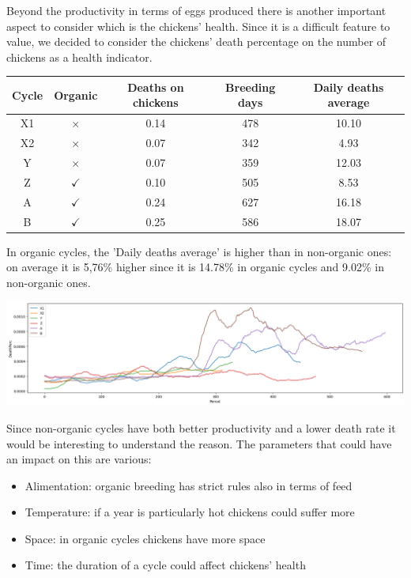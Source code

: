 \documentclass[11pt]{article}
\begin{document}
Beyond the productivity in terms of eggs produced there is another important aspect to consider which is the chickens' health. Since it is a difficult feature to value,
we decided to consider the chickens' death percentage on the number of chickens as a health indicator.

\begin{center}
    \begin{tabular}{| c | c | c | c | c |}
        \hline
        Cycle & Organic      & Deaths on chickens & Breeding days & Daily deaths average \\ [0.5ex]
        \hline
        X1    & $\times$     & 0.14               & 478           & 10.10                \\ [0.5ex]
        \hline
        X2    & $\times$     & 0.07               & 342           & 4.93                 \\ [0.5ex]
        \hline
        Y     & $\times$     & 0.07               & 359           & 12.03                \\ [0.5ex]
        \hline
        Z     & $\checkmark$ & 0.10               & 505           & 8.53                 \\ [0.5ex]
        \hline
        A     & $\checkmark$ & 0.24               & 627           & 16.18                \\ [0.5ex]
        \hline
        B     & $\checkmark$ & 0.25               & 586           & 18.07                \\ [0.5ex]
        \hline
    \end{tabular}
\end{center}

In organic cycles, the 'Daily deaths average' is higher than in non-organic ones: on average it is 5,76\% higher since it is 14.78\% in organic cycles and 9.02\% in non-organic ones.

\includegraphics[width=\linewidth]{../Results/OrganingOrNot/DeathPerc.png}

Since non-organic cycles have both better productivity and a lower death rate it would be interesting to understand the reason. The parameters that could have an impact on this are various:
\begin{itemize}
    \item Alimentation: organic breeding has strict rules also in terms of feed
    \item Temperature: if a year is particularly hot chickens could suffer more
    \item Space: in organic cycles chickens have more space
    \item Time: the duration of a cycle could affect chickens' health
\end{itemize}
\end{document}
